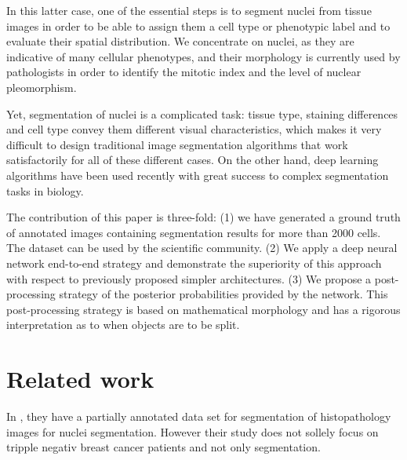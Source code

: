 \documentclass{article}
\begin{document}
In this latter case, one of the essential steps is to
segment nuclei from tissue images in order to be able to
assign them a cell type or phenotypic label and to evaluate their
spatial distribution. We concentrate on nuclei, as they are indicative
of many cellular phenotypes\cite{Chow2012}, and their morphology is 
currently used by pathologists in order to
identify the mitotic index and the level of nuclear
pleomorphism\cite{Elston1991}. 

Yet, segmentation of nuclei is a
complicated task: tissue type, staining differences and cell type
convey them different visual characteristics, which makes it very difficult to
design traditional image segmentation algorithms that work
satisfactorily for all of these different cases. On the other hand,
deep learning algorithms have been used recently with great success to
complex segmentation tasks in biology\cite{Ciresan2012,UNet}. 

The contribution of this paper is three-fold: (1) we have generated a
ground truth of annotated images containing segmentation results for
more than 2000 cells. The dataset can be used by the scientific
community. (2) We apply a deep neural network end-to-end strategy and
demonstrate the superiority of this approach with respect to
previously proposed simpler architectures. (3) We propose a
post-processing strategy of the posterior probabilities provided by
the network. This post-processing strategy is based on mathematical
morphology and has a rigorous interpretation as to when objects are to
be split. 

\section{Related work}
\label{sec:related}

\noindent In \cite{Drelie08-298}, they have a partially annotated data set for segmentation of 
histopathology images for nuclei segmentation.   However their study does not sollely focus on tripple negativ breast cancer patients and not only segmentation.

\end{document}
